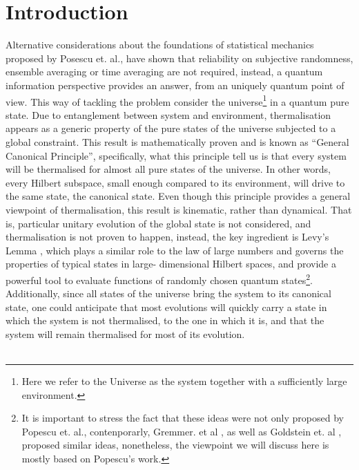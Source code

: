 
\chapter*{Introduction}

Alternative considerations about the foundations of statistical mechanics proposed by Posescu et. al.\cite{popescu_foundations_2005},  have shown that reliability on subjective randomness, ensemble averaging or time averaging are not required, instead, a quantum information perspective\cite{horodecki_partial_2005} provides an answer, from an uniquely quantum point of view. This way of tackling the problem consider the universe\footnote{Here we refer to the Universe as the system together with a sufficiently large environment.} in a quantum pure state. Due to entanglement between system and environment, thermalisation appears as a generic property of the pure states of the universe subjected to a global constraint. This result is mathematically proven and is known as ``General Canonical Principle'', specifically, what this principle tell us is that every system will be thermalised for almost all pure states of the universe. In other words, every Hilbert subspace, small enough compared to its environment, will drive to the same state, the canonical state. Even though this principle provides a general viewpoint of thermalisation, this result is kinematic, rather than dynamical. That is, particular unitary evolution of the global state is not considered, and thermalisation is not proven to happen, instead, the key ingredient is Levy's Lemma \cite{milman_asymptotic_2009,ledoux_concentration_2005}, which plays a similar role to the law of large numbers and governs the properties of typical states in large- dimensional Hilbert spaces\cite{popescu_foundations_2005}, and provide a powerful tool to evaluate functions of randomly chosen quantum states\footnote{It is important to stress the fact that these ideas were not only proposed by Popescu et. al., contenporarly,  Gremmer. et al \cite{gemmer_quantum_2004}, as well as Goldstein et. al \cite{goldstein_canonical_2006}, proposed similar ideas, nonetheless, the viewpoint we will discuss here is mostly based on Popescu's work.}.  Additionally, since all states of the universe bring the system to its canonical state, one could anticipate that most evolutions will quickly carry a state in which the system is not thermalised, to the one in which it is, and that the system will remain thermalised for most of its evolution.\\\\
